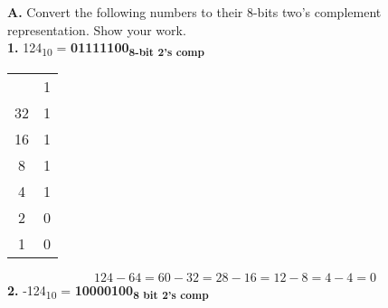 \documentclass[12pt, letterpaper, twoside]{article}
\begin{document}
\noindent \textbf{A.} Convert the following numbers to their 8-bits two’s complement representation. Show your work.\\
\noindent\textbf{1.} 124\textsubscript{10} = \textbf{01111100\textsubscript{8-bit 2's comp}}

\begin{center}
\begin{tabular}{c|c}
\centering
64 & 1\\
32 & 1\\
16 & 1\\ 
8 & 1\\
4 & 1\\
2 & 0\\
1 & 0\\
\end{tabular}
\end{center}
\[124-64=60-32=28-16=12-8=4-4=0\]
\break
\noindent\textbf{2.} -124\textsubscript{10} = \textbf{10000100\textsubscript{8 bit 2’s comp}}\\
\end{document}
